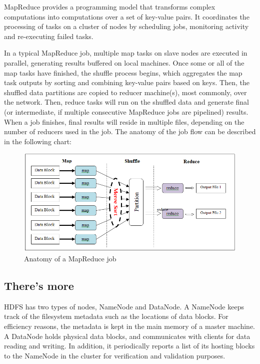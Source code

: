 MapReduce provides a programming model that transforms complex computations into computations over a set of key-value pairs. It coordinates the processing of tasks on a cluster of nodes by scheduling jobs, monitoring activity and re-executing failed tasks.

In a typical MapReduce job, multiple map tasks on slave nodes are executed in parallel, generating results buffered on local machines. Once some or all of the map tasks have finished, the shuffle process begins, which aggregates the map task outputs by sorting and combining key-value pairs based on keys. Then, the shuffled data partitions are copied to reducer machine(s), most commonly, over the network. Then, reduce tasks will run on the shuffled data and generate final (or intermediate, if multiple consecutive MapReduce jobs are pipelined) results. When a job finishes, final results will reside in multiple files, depending on the number of reducers used in the job. The anatomy of the job flow can be described in the following chart:

\begin{figure}[h]
  \centering
  \includegraphics[width=\textwidth]{figs/5163OS_01_02.png}
  \caption{Anatomy of a MapReduce job}\label{fig:mapred.job}
\end{figure} 

\subsection*{There's more}
HDFS has two types of nodes, NameNode and DataNode. A NameNode keeps track of the filesystem metadata such as the locations of data blocks. For efficiency reasons, the metadata is kept in the main memory of a master machine. A DataNode holds physical data blocks, and communicates with clients for data reading and writing. In addition, it periodically reports a list of its hosting blocks to the NameNode in the cluster for verification and validation purposes.

